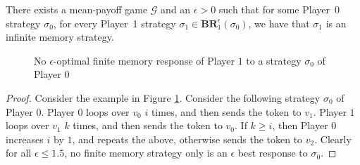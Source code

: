 \begin{theorem}
\label{ThmP1NeedInfMem}
There exists a mean-payoff game $\mathcal{G}$ and an $\epsilon > 0$ such that for some Player~0 strategy $\sigma_0$, for every Player~1 strategy $\sigma_1 \in \mathbf{BR}_1^{\epsilon}(\sigma_0)$, we have that $\sigma_1$ is an infinite memory strategy.
\end{theorem}
\begin{figure}
    \centering
    \caption{No $\epsilon$-optimal finite memory response of Player $1$ to a strategy $\sigma_0$ of Player $0$}
    \label{fig:no_optimal_response}
\end{figure}
\begin{proof}
Consider the example in Figure \ref{fig:no_optimal_response}.
Consider the following strategy $\sigma_0$ of Player $0$.
Player $0$ loops over $v_0$ $i$ times, and then sends the token to $v_1$.
Player $1$ loops over $v_1$ $k$ times, and then sends the token to $v_0$.
If $k \geqslant i$, then Player $0$ increases $i$ by $1$, and repeats the above, otherwise sends the token to $v_2$.
Clearly for all $\epsilon \leqslant 1.5$, no finite memory strategy only is an $\epsilon$ best response to $\sigma_0$.
\end{proof}